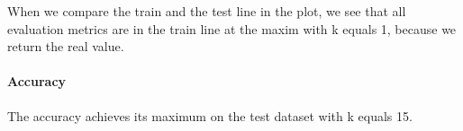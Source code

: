 \documentclass[
]{article}
\newenvironment{Shaded}{\begin{snugshade}}{\end{snugshade}}
\newcommand{\DecValTok}[1]{\textcolor[rgb]{0.00,0.00,0.81}{#1}}
\newcommand{\KeywordTok}[1]{\textcolor[rgb]{0.13,0.29,0.53}{\textbf{#1}}}
\newcommand{\NormalTok}[1]{#1}
\newcommand{\OperatorTok}[1]{\textcolor[rgb]{0.81,0.36,0.00}{\textbf{#1}}}
\newcommand{\StringTok}[1]{\textcolor[rgb]{0.31,0.60,0.02}{#1}}
\begin{document}
\begin{Shaded}
\end{Shaded}

\hypertarget{section-4}{%
\subsubsection{}\label{section-4}}

When we compare the train and the test line in the plot, we see that all
evaluation metrics are in the train line at the maxim with k equals 1,
because we return the real value.

\hypertarget{accuracy-1}{%
\paragraph{Accuracy}\label{accuracy-1}}

The accuracy achieves its maximum on the test dataset with k equals 15.
\end{document}
